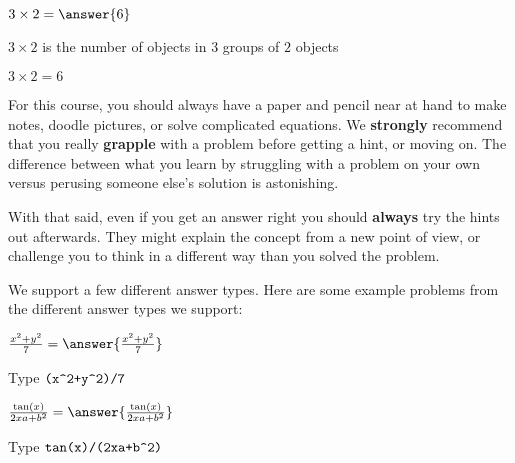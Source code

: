 \documentclass{ximera}
\begin{document}
\begin{problem}
  $3\times 2 = \answer{6}$   
  \begin{hint}
    $3 \times 2$ is the number of objects in $3$ groups of $2$ objects
  \end{hint}
  \begin{hint}
    \begin{image}
    \end{image}
  \end{hint}
  \begin{hint}
    $3\times 2=6$
  \end{hint}
\end{problem}

For this course, you should always have a paper and pencil near at
hand to make notes, doodle pictures, or solve complicated equations.
We \textbf{strongly} recommend that you really \textbf{grapple} with a
problem before getting a hint, or moving on.  The difference between
what you learn by struggling with a problem on your own versus
perusing someone else's solution is astonishing.

With that said, even if you get an answer right you should
\textbf{always} try the hints out afterwards.  They might explain the
concept from a new point of view, or challenge you to think in a
different way than you solved the problem.


We support a few different answer types. Here are some example
problems from the different answer types we support:

\begin{problem}
  $\frac{x^2+y^2}{7} = \answer{\frac{x^2+y^2}{7}}$
  \begin{hint}
    Type $\verb|(x^2+y^2)/7|$
  \end{hint}
\end{problem}

\begin{problem}
  $\frac{\tan(x)}{2xa+b^2} = \answer{\frac{\tan(x)}{2xa+b^2} }$
  \begin{hint}
    Type $\verb|tan(x)/(2xa+b^2)|$
  \end{hint}
\end{problem}
\end{document}
